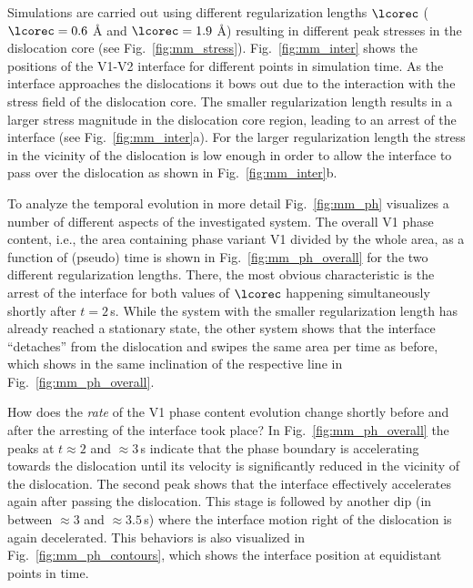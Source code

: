 \documentclass[preprint,review,3p,times,authoryear]{elsarticle}
\begin{document}
Simulations are carried out using different regularization lengths $\lcorec$ ($\lcorec=0.6$ \AA{} and $\lcorec=1.9$ \AA{}) resulting in different peak stresses in the dislocation core (see Fig.~\ref{fig:mm_stress}).
Fig.~\ref{fig:mm_inter} shows the positions of the V1-V2 interface for different points in simulation time. As the interface approaches the dislocations it bows out due to the interaction with the stress field of the dislocation core. The smaller regularization length results in a larger stress magnitude in the dislocation core region, leading to an arrest of the interface (see Fig.~\ref{fig:mm_inter}a). For the larger regularization length the stress in the vicinity of the dislocation is low enough in order to allow the interface to pass over the dislocation as shown in Fig.~\ref{fig:mm_inter}b. 

To analyze the temporal evolution in more detail Fig.~\ref{fig:mm_ph} visualizes a number of different aspects of the investigated system. The overall V1 phase content, i.e., the area containing phase variant V1 divided by the whole area, as a function of (pseudo) time is shown in Fig.~\ref{fig:mm_ph_overall} for the two different regularization lengths. There, the most obvious characteristic is the arrest of the interface for both values of $\lcorec$ happening simultaneously shortly after $t=2$\,\textmu s. While the system with the smaller regularization length has already reached a stationary state, the other system shows that the interface ``detaches'' from the dislocation and swipes the same area per time as before, which shows in the same inclination of the respective line in Fig.~\ref{fig:mm_ph_overall}. 

How does the  \emph{rate} of the V1 phase content evolution change shortly before and after the arresting of the interface took place? In Fig.~\ref{fig:mm_ph_overall} the peaks at $t\approx 2$ and $\approx 3$\,\textmu s indicate that the phase boundary is accelerating towards the dislocation until its velocity is significantly reduced in the vicinity of the dislocation. The second peak shows that the interface effectively accelerates again after passing the dislocation. This stage is followed by another dip (in between $\approx 3$ and $\approx 3.5$\,\textmu s) where the interface motion right of the dislocation is again decelerated. This behaviors is also visualized in Fig.~\ref{fig:mm_ph_contours}, which shows the interface position at equidistant points in time. 
\end{document}
